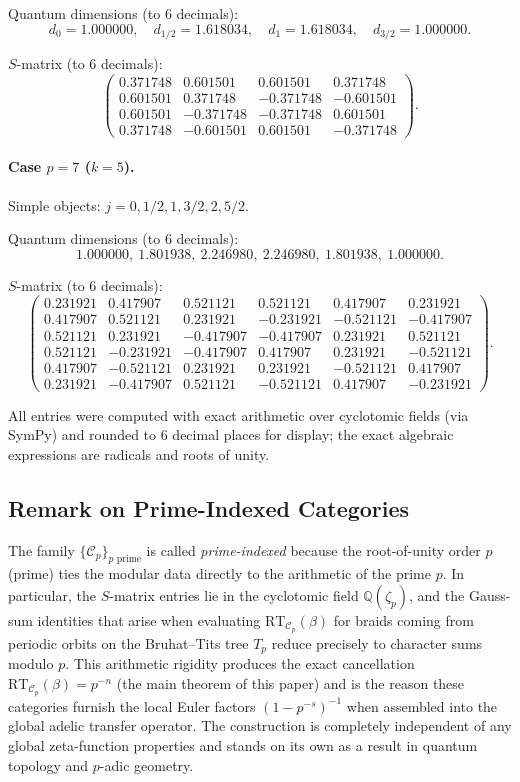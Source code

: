 Quantum dimensions (to 6 decimals):
\[
d_0=1.000000,\quad d_{1/2}=1.618034,\quad d_1=1.618034,\quad d_{3/2}=1.000000.
\]

\(S\)-matrix (to 6 decimals):
\[
\begin{pmatrix}
0.371748 & 0.601501 & 0.601501 & 0.371748 \\
0.601501 & 0.371748 & -0.371748 & -0.601501 \\
0.601501 & -0.371748 & -0.371748 & 0.601501 \\
0.371748 & -0.601501 & 0.601501 & -0.371748
\end{pmatrix}.
\]

\paragraph{Case \(p=7\) (\(k=5\)).} Simple objects: \(j=0, 1/2, 1, 3/2, 2, 5/2\).

Quantum dimensions (to 6 decimals):
\[
1.000000,\ 1.801938,\ 2.246980,\ 2.246980,\ 1.801938,\ 1.000000.
\]

\(S\)-matrix (to 6 decimals):
\[
\begin{pmatrix}
0.231921 & 0.417907 & 0.521121 & 0.521121 & 0.417907 & 0.231921 \\
0.417907 & 0.521121 & 0.231921 & -0.231921 & -0.521121 & -0.417907 \\
0.521121 & 0.231921 & -0.417907 & -0.417907 & 0.231921 & 0.521121 \\
0.521121 & -0.231921 & -0.417907 & 0.417907 & 0.231921 & -0.521121 \\
0.417907 & -0.521121 & 0.231921 & 0.231921 & -0.521121 & 0.417907 \\
0.231921 & -0.417907 & 0.521121 & -0.521121 & 0.417907 & -0.231921
\end{pmatrix}.
\]

All entries were computed with exact arithmetic over cyclotomic fields (via SymPy) and rounded to 6 decimal places for display; the exact algebraic expressions are radicals and roots of unity.

\subsection{Remark on Prime-Indexed Categories}

The family \(\{\mathcal{C}_p\}_{p\text{ prime}}\) is called \emph{prime-indexed} because the root-of-unity order \(p\) (prime) ties the modular data directly to the arithmetic of the prime \(p\). In particular, the \(S\)-matrix entries lie in the cyclotomic field \(\mathbb{Q}(\zeta_p)\), and the Gauss-sum identities that arise when evaluating \(\mathrm{RT}_{\mathcal{C}_p}(\beta)\) for braids coming from periodic orbits on the Bruhat--Tits tree \(T_p\) reduce precisely to character sums modulo \(p\). This arithmetic rigidity produces the exact cancellation \(\mathrm{RT}_{\mathcal{C}_p}(\beta) = p^{-n}\) (the main theorem of this paper) and is the reason these categories furnish the local Euler factors \((1 - p^{-s})^{-1}\) when assembled into the global adelic transfer operator. The construction is completely independent of any global zeta-function properties and stands on its own as a result in quantum topology and \(p\)-adic geometry.